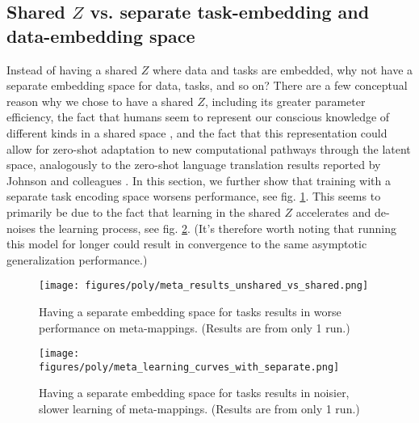 \subsection{Shared $Z$ vs. separate task-embedding and data-embedding space} \label{app_lesion_results_shared_z}
Instead of having a shared $Z$ where data and tasks are embedded, why not have a separate embedding space for data, tasks, and so on? There are a few conceptual reason why we chose to have a shared $Z$, including its greater parameter efficiency, the fact that humans seem to represent our conscious knowledge of different kinds in a shared space \citep[][]{Baars2005}, and the fact that this representation could allow for zero-shot adaptation to new computational pathways through the latent space, analogously to the zero-shot language translation results reported by Johnson and colleagues \citep{Johnson2016a}. In this section, we further show that training with a separate task encoding space worsens performance, see fig. \ref{supp_lesion_shared_z_fig}. This seems to primarily be due to the fact that learning in the shared $Z$ accelerates and de-noises the learning process, see fig. \ref{supp_lesion_shared_z_learn_fig}. (It's therefore worth noting that running this model for longer could result in convergence to the same asymptotic generalization performance.) \par
\begin{figure}[H]
\centering
\texttt{[image: figures/poly/meta\_results\_unshared\_vs\_shared.png]}
\caption{Having a separate embedding space for tasks results in worse performance on meta-mappings. (Results are from only 1 run.)}
\label{supp_lesion_shared_z_fig}
\end{figure}
\begin{figure}[H]
\centering
\texttt{[image: figures/poly/meta\_learning\_curves\_with\_separate.png]}
\caption{Having a separate embedding space for tasks results in noisier, slower learning of meta-mappings. (Results are from only 1 run.)}
\label{supp_lesion_shared_z_learn_fig}
\end{figure}

